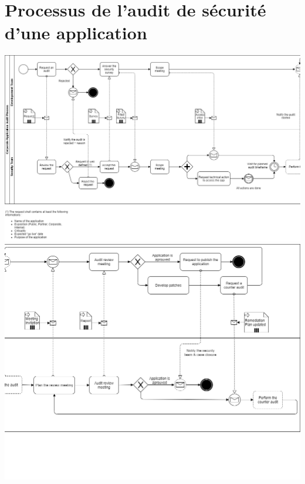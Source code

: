 \section{Processus de l'audit de sécurité d'une application}
\label{appendix:processaudit}
\vspace{2em}
\centering
\includegraphics[width=\textwidth]{resources/img/process_audit_pt1.png}
\includegraphics[width=\textwidth]{resources/img/process_audit_pt2.png}